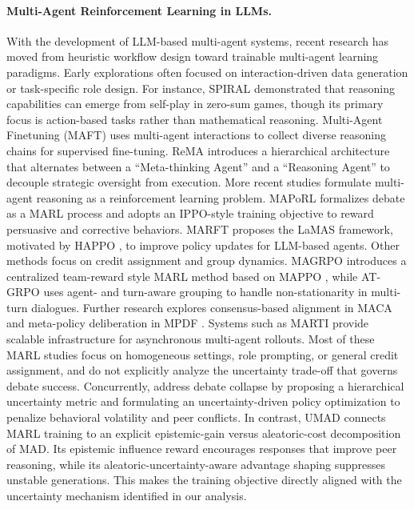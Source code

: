 \documentclass{article}
\theoremstyle{plain}
\theoremstyle{definition}
\theoremstyle{remark}
\begin{document}
\paragraph{Multi-Agent Reinforcement Learning in LLMs.}
With the development of LLM-based multi-agent systems, recent research has moved from heuristic workflow design toward trainable multi-agent learning paradigms. Early explorations often focused on interaction-driven data generation or task-specific role design. For instance, SPIRAL \cite{liu2025spiral} demonstrated that reasoning capabilities can emerge from self-play in zero-sum games, though its primary focus is action-based tasks rather than mathematical reasoning. Multi-Agent Finetuning (MAFT) \cite{subramaniam2025multiagent} uses multi-agent interactions to collect diverse reasoning chains for supervised fine-tuning. ReMA \cite{wan2025rema} introduces a hierarchical architecture that alternates between a ``Meta-thinking Agent'' and a ``Reasoning Agent'' to decouple strategic oversight from execution.
More recent studies formulate multi-agent reasoning as a reinforcement learning problem. MAPoRL \cite{park2025maporl} formalizes debate as a MARL process and adopts an IPPO-style \cite{de2020independent} training objective to reward persuasive and corrective behaviors. MARFT \cite{liao2025marft} proposes the LaMAS framework, motivated by HAPPO \cite{kuba2021trust}, to improve policy updates for LLM-based agents. Other methods focus on credit assignment and group dynamics. MAGRPO \cite{liu2025llm} introduces a centralized team-reward style MARL method based on MAPPO \cite{yu2022surprising}, while AT-GRPO \cite{zhao2025stronger} uses agent- and turn-aware grouping to handle non-stationarity in multi-turn dialogues. Further research explores consensus-based alignment in MACA \cite{samanta2025self} and meta-policy deliberation in MPDF \cite{yang2025learning}. Systems such as MARTI \cite{zhang2025marti} provide scalable infrastructure for asynchronous multi-agent rollouts.
Most of these MARL studies focus on homogeneous settings, role prompting, or general credit assignment, and do not explicitly analyze the uncertainty trade-off that governs debate success. Concurrently, \citet{tang2026value} address debate collapse by proposing a hierarchical uncertainty metric and formulating an uncertainty-driven policy optimization to penalize behavioral volatility and peer conflicts. In contrast, UMAD connects MARL training to an explicit epistemic-gain versus aleatoric-cost decomposition of MAD. Its epistemic influence reward encourages responses that improve peer reasoning, while its aleatoric-uncertainty-aware advantage shaping suppresses unstable generations. This makes the training objective directly aligned with the uncertainty mechanism identified in our analysis.
\end{document}
